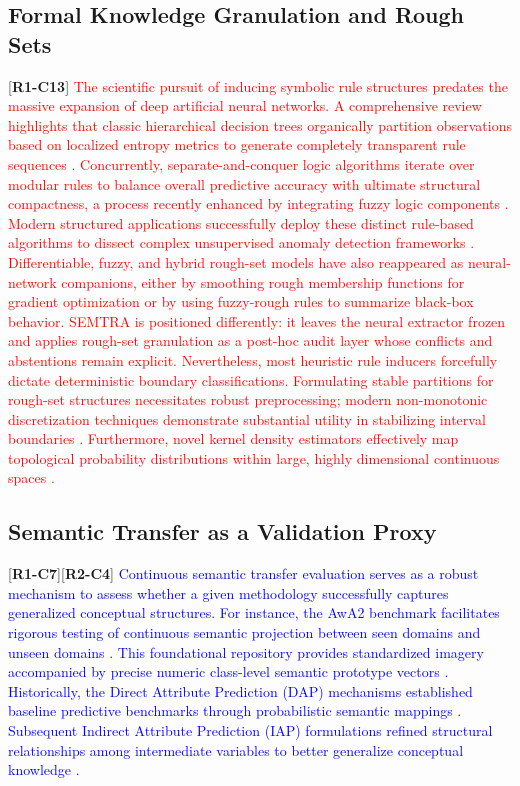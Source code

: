 \documentclass[make,article,submit,pdftex,moreauthors]{Definitions/mdpi}
\newcommand{\revtag}[2]{[\textbf{R#1-C#2}]}
\newcommand{\Rone}[1]{\textcolor{red}{#1}}
\newcommand{\Rtwo}[1]{\textcolor{blue}{#1}}
\begin{document}
\subsection{Formal Knowledge Granulation and Rough Sets}
\label{subsec:symbolic_rule_extraction}
\revtag{1}{13} \Rone{The scientific pursuit of inducing symbolic rule structures predates the massive expansion of deep artificial neural networks. A comprehensive review highlights that classic hierarchical decision trees organically partition observations based on localized entropy metrics to generate completely transparent rule sequences \cite{Mienye2024DecisionTrees}. Concurrently, separate-and-conquer logic algorithms iterate over modular rules to balance overall predictive accuracy with ultimate structural compactness, a process recently enhanced by integrating fuzzy logic components \cite{Bollaert2024FRRI}. Modern structured applications successfully deploy these distinct rule-based algorithms to dissect complex unsupervised anomaly detection frameworks \cite{Zhang2024DissectBlackBox}. Differentiable, fuzzy, and hybrid rough-set models have also reappeared as neural-network companions, either by smoothing rough membership functions for gradient optimization or by using fuzzy-rough rules to summarize black-box behavior. SEMTRA is positioned differently: it leaves the neural extractor frozen and applies rough-set granulation as a post-hoc audit layer whose conflicts and abstentions remain explicit. Nevertheless, most heuristic rule inducers forcefully dictate deterministic boundary classifications. Formulating stable partitions for rough-set structures necessitates robust preprocessing; modern non-monotonic discretization techniques demonstrate substantial utility in stabilizing interval boundaries \cite{SenozanSoylu2024Discretization}. Furthermore, novel kernel density estimators effectively map topological probability distributions within large, highly dimensional continuous spaces \cite{Biroli2026KDEHighDim}.}

\subsection{Semantic Transfer as a Validation Proxy}
\label{subsec:semantic_transfer}
\revtag{1}{7}\revtag{2}{4} \Rone{\Rtwo{Continuous semantic transfer evaluation serves as a robust mechanism to assess whether a given methodology successfully captures generalized conceptual structures. For instance, the AwA2 benchmark facilitates rigorous testing of continuous semantic projection between seen domains and unseen domains \cite{Xian2019AwA2}. This foundational repository provides standardized imagery accompanied by precise numeric class-level semantic prototype vectors \cite{AwA2Website}. Historically, the Direct Attribute Prediction (DAP) mechanisms established baseline predictive benchmarks through probabilistic semantic mappings \cite{Lampert2009Attribute}. Subsequent Indirect Attribute Prediction (IAP) formulations refined structural relationships among intermediate variables to better generalize conceptual knowledge \cite{Lampert2014Attribute}.}}
\end{document}
